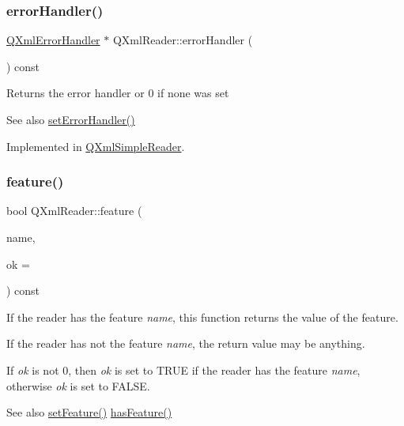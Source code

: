\subsubsection{\texorpdfstring{errorHandler()}{errorHandler()}}
{\footnotesize\ttfamily \mbox{\hyperlink{class_q_xml_error_handler}{Q\+Xml\+Error\+Handler}} $\ast$ Q\+Xml\+Reader\+::error\+Handler (\begin{DoxyParamCaption}{ }\end{DoxyParamCaption}) const\hspace{0.3cm}{\ttfamily [pure virtual]}}

Returns the error handler or 0 if none was set

\begin{DoxySeeAlso}{See also}
\mbox{\hyperlink{class_q_xml_reader_a97cab92522d1ceb8f6da94a161a72ee2}{set\+Error\+Handler()}} 
\end{DoxySeeAlso}


Implemented in \mbox{\hyperlink{class_q_xml_simple_reader_ab490598616bb52328fcc0b78afca6a5f}{Q\+Xml\+Simple\+Reader}}.

\mbox{\label{class_q_xml_reader_ab4d90af8a5440668582f53e47e9a81d6}} 
\subsubsection{\texorpdfstring{feature()}{feature()}}
{\footnotesize\ttfamily bool Q\+Xml\+Reader\+::feature (\begin{DoxyParamCaption}\item[{const \mbox{\hyperlink{class_q_string}{Q\+String}} \&}]{name,  }\item[{bool $\ast$}]{ok = {} }\end{DoxyParamCaption}) const\hspace{0.3cm}{\ttfamily [pure virtual]}}

If the reader has the feature {\itshape name}, this function returns the value of the feature.

If the reader has not the feature {\itshape name}, the return value may be anything.

If {\itshape ok} is not 0, then {\itshape ok} is set to T\+R\+UE if the reader has the feature {\itshape name}, otherwise {\itshape ok} is set to F\+A\+L\+SE.

\begin{DoxySeeAlso}{See also}
\mbox{\hyperlink{class_q_xml_reader_a6673b0e33ef628df75410fabdafa3684}{set\+Feature()}} \mbox{\hyperlink{class_q_xml_reader_ac9835c64b96d42b60f0bec5962153582}{has\+Feature()}} 
\end{DoxySeeAlso}


